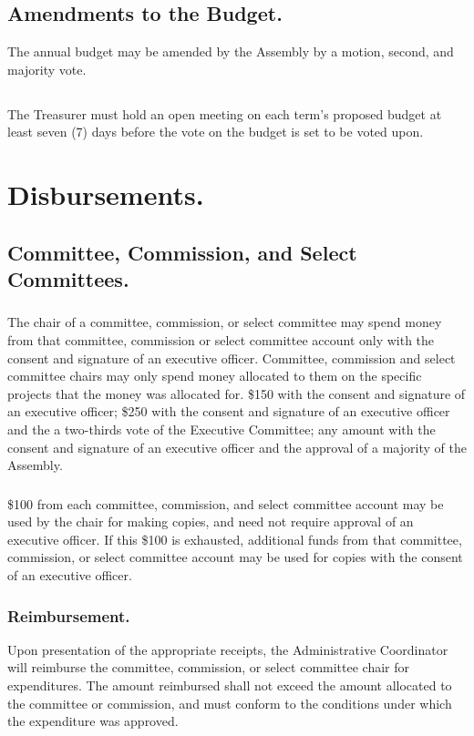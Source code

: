 \subsection{Amendments to the Budget.}
The annual budget may be amended by the Assembly by a motion, second, and majority vote.

\subsection{}
The Treasurer must hold an open meeting on each term's proposed budget at least seven (7) days before the vote on the budget is set to be voted upon.


\section{Disbursements.}

\subsection{Committee, Commission, and Select Committees.}
\subsubsection{}
The chair of a committee, commission, or select committee may spend money from that committee, commission or select committee account only with the consent and signature of an executive officer. Committee, commission and select committee chairs may only spend money allocated to them on the specific projects that the money was allocated for.
\subsubsubsection{}
\$150 with the consent and signature of an executive officer;
\subsubsubsection{}
\$250 with the consent and signature of an executive officer and the a two-thirds vote of the Executive Committee;
\subsubsubsection{}
any amount with the consent and signature of an executive officer and the approval of a majority of the Assembly.
\subsubsection{}
\$100 from each committee, commission, and select committee account may be used by the chair for making copies, and need not require approval of an executive officer.  If this \$100 is exhausted, additional funds from that committee, commission, or select committee account may be used for copies with the consent of an executive officer.
\subsubsection{Reimbursement.}
Upon presentation of the appropriate receipts, the Administrative Coordinator will reimburse the committee, commission, or select committee chair for expenditures.  The amount reimbursed shall not exceed the amount allocated to the committee or commission, and must conform to the conditions under which the expenditure was approved.
